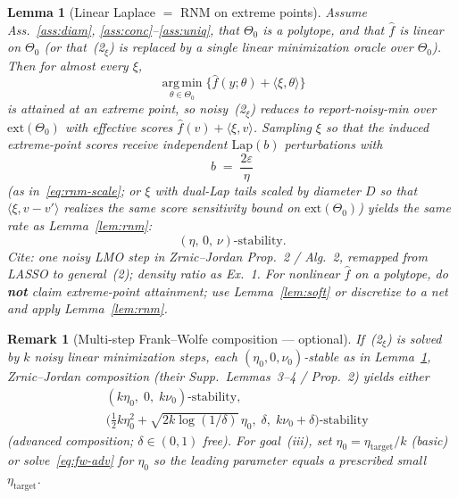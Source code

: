 \documentclass[11pt]{article}
\newtheorem{lemma}{Lemma}
\newtheorem{remark}{Remark}
\begin{document}
\begin{lemma}[Linear Laplace $=$ RNM on extreme points]
\label{lem:lin-lap}
Assume Ass.~\ref{ass:diam}, \ref{ass:conc}--\ref{ass:uniq}, that $\Theta_0$ is a polytope, and that
$\hat f$ is \emph{linear} on $\Theta_0$ (or that~(2$_\xi$) is replaced by a single linear
minimization oracle over $\Theta_0$).
Then for almost every $\xi$,
\[
\operatorname*{arg\,min}_{\theta\in\Theta_0}\bigl\{\hat f(y;\theta)+\langle\xi,\theta\rangle\bigr\}
\]
is attained at an extreme point, so noisy~(2$_\xi$) reduces to report-noisy-min over
$\mathrm{ext}(\Theta_0)$ with effective scores $\hat f(v)+\langle\xi,v\rangle$.
Sampling $\xi$ so that the induced extreme-point scores receive independent
$\mathrm{Lap}(b)$ perturbations with
\begin{equation}
\label{eq:lin-scale}
b \;=\; \frac{2\varepsilon}{\eta}
\end{equation}
(as in~\eqref{eq:rnm-scale}; or $\xi$ with dual-Lap tails scaled by diameter $D$ so that
$\langle\xi,v-v'\rangle$ realizes the same score sensitivity bound on $\mathrm{ext}(\Theta_0)$)
yields the same rate as Lemma~\ref{lem:rnm}:
\begin{equation}
\label{eq:lin-rate}
(\eta,\,0,\,\nu)\text{-stability}.
\end{equation}
\textit{Cite:} one noisy LMO step in Zrnic--Jordan Prop.~2 / Alg.~2, remapped from LASSO
to general~(2); density ratio as Ex.~1. For \emph{nonlinear} $\hat f$ on a polytope, do
\textbf{not} claim extreme-point attainment; use Lemma~\ref{lem:soft} or discretize to a
net and apply Lemma~\ref{lem:rnm}.
\end{lemma}

\begin{remark}[Multi-step Frank--Wolfe composition --- optional]
\label{rem:fw}
If~(2$_\xi$) is solved by $k$ noisy linear minimization steps, each $(\eta_0,0,\nu_0)$-stable as in
Lemma~\ref{lem:lin-lap}, Zrnic--Jordan composition (their Supp.\ Lemmas~3--4 / Prop.~2) yields either
\begin{align}
\label{eq:fw-basic}
&(k\eta_0,\;0,\;k\nu_0)\text{-stability},\\
\label{eq:fw-adv}
&\bigl(\tfrac12 k\eta_0^2+\sqrt{2k\log(1/\delta)}\,\eta_0,\;\delta,\;k\nu_0+\delta\bigr)
\text{-stability}
\end{align}
(advanced composition; $\delta\in(0,1)$ free).
For goal~(iii), set $\eta_0=\eta_{\mathrm{target}}/k$ (basic) or solve~\eqref{eq:fw-adv} for $\eta_0$ so the
leading parameter equals a prescribed small $\eta_{\mathrm{target}}$.
\end{remark}
\end{document}
